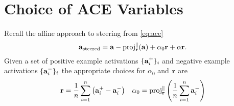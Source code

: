 \chapter{Choice of ACE Variables}
\label{app:ace}

\begin{remark}
    Recall the affine approach to steering from \cref{eq:ace}
    \begin{equation*}
        \mathbf{a}_\text{\normalfont steered} = \mathbf{a} - \text{\normalfont proj}_{\mathbf{r}}^{\parallel}(\mathbf{a}) + \alpha_0\mathbf{r} + \alpha\mathbf{r}.
    \end{equation*}
    Given a set of positive example activations $\{\mathbf{a}_i^+\}_i$ and negative example activations $\{\mathbf{a}_i^-\}_i$ the appropriate choices for $\alpha_0$ and $\mathbf{r}$ are
    \begin{equation}
        \label{eq:ace-app}
        \begin{aligned}
            \mathbf{r} = \frac{1}{n}\sum_{i=1}^{n}\left(\mathbf{a}_i^+ - \mathbf{a}_i^-\right) && \alpha_0 = \text{\normalfont proj}_{\mathbf{r}}^\parallel\left(\frac{1}{n}\sum_{i=1}^{n}\mathbf{a}_i^-\right)
        \end{aligned}
    \end{equation}
\end{remark}
